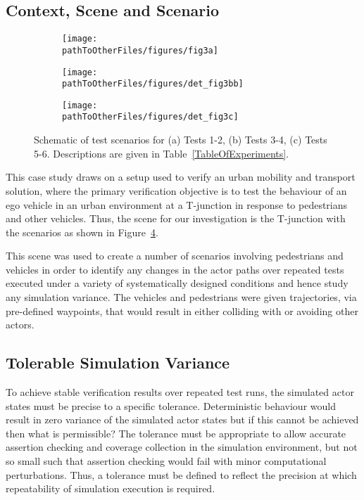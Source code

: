 \subsection{Context, Scene and Scenario}\label{TestsDescriptionAndTechnicalities}
\begin{figure}[!t]
    \centering
    \begin{subfigure}{.24\textwidth}
        \texttt{[image: \\pathToOtherFiles/figures/fig3a]}
        \caption{}
        \label{Test_a}
    \end{subfigure}
    \begin{subfigure}{.24\textwidth}
        \texttt{[image: \\pathToOtherFiles/figures/det\_fig3bb]}
        \caption{}
        \label{Test_b}
    \end{subfigure}
    \begin{subfigure}{.24\textwidth}
        \texttt{[image: \\pathToOtherFiles/figures/det\_fig3c]}
        \caption{}
        \label{Test_c}
    \end{subfigure}
    \caption{Schematic of test scenarios for (a) Tests 1-2, (b) Tests 3-4, (c) Tests 5-6. Descriptions are given in Table~\ref{TableOfExperiments}.}\label{f:test_a_and_b}
\end{figure}

This case study draws on a setup used to verify an urban mobility and transport solution, where the primary verification objective is to test the behaviour of an ego vehicle in an urban environment at a T-junction in response to pedestrians and other vehicles. Thus, the scene for our investigation is the T-junction with the scenarios as shown in Figure~\ref{f:test_a_and_b}.

This scene was used to create a number of scenarios involving pedestrians and vehicles in order to identify any changes in the actor paths over repeated tests executed under a variety of systematically designed conditions and hence study any simulation variance. The vehicles and pedestrians were given trajectories, via pre-defined waypoints, that would result in either colliding with or avoiding other actors.

\subsection{Tolerable Simulation Variance}\label{s:tolerance}
To achieve stable verification results over repeated test runs, the simulated actor states must be precise to a specific tolerance. Deterministic behaviour would result in zero variance of the simulated actor states but if this cannot be achieved then what is permissible? The tolerance must be appropriate to allow accurate assertion checking and coverage collection in the simulation environment, but not so small such that assertion checking would fail with minor computational perturbations. Thus, a tolerance must be defined to reflect the precision at which repeatability of simulation execution is required. 

